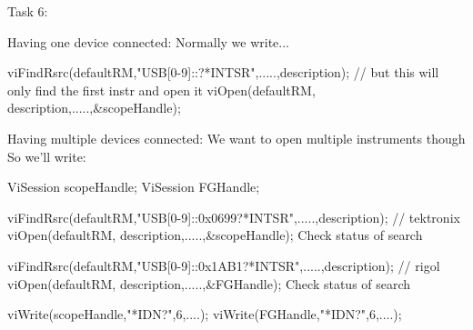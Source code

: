 
Task 6:

Having one device connected:
Normally we write...

viFindRsrc(defaultRM,"USB[0-9]::?*INTSR",.....,description);
// but this will only find the first instr and open it
viOpen(defaultRM, description,.....,&scopeHandle);

Having multiple devices connected:
We want to open multiple instruments though 
So we'll write:

ViSession scopeHandle;
ViSession FGHandle;

viFindRsrc(defaultRM,"USB[0-9]::0x0699?*INTSR",.....,description); // tektronix
viOpen(defaultRM, description,.....,&scopeHandle);
Check status of search

viFindRsrc(defaultRM,"USB[0-9]::0x1AB1?*INTSR",.....,description); // rigol
viOpen(defaultRM, description,.....,&FGHandle);
Check status of search

viWrite(scopeHandle,"*IDN?\n",6,....);
viWrite(FGHandle,"*IDN?\n",6,....);

